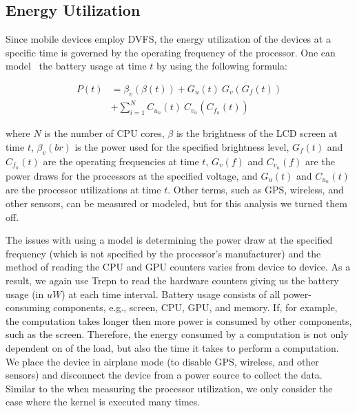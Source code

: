 \subsection{Energy Utilization}


Since mobile devices employ DVFS,
  the energy utilization of the devices at a specific time is governed by
  the operating frequency of the processor.
One can model~\cite{zhang2010accurate, dong2011self} the battery usage
at time $t$ by using the following formula:

\begin{align*}
P(t) &= \beta_v(\beta(t)) + G_u(t) ~ G_v(G_f(t)) \\
     &+ \sum_{i=1}^{N} C_{u_n}(t) ~ C_{v_n}(C_{f_n}(t))
\end{align*}

where $N$ is the number of CPU cores, $\beta$ is the brightness of the LCD screen at time $t$, $\beta_v(br)$ is the power used for the specified brightness level, $G_f(t)$ and $C_{f_n}(t)$ are the operating frequencies at time $t$, $G_v(f)$ and $ C_{v_n}(f)$ are the power draws for the processors at the specified voltage, and $G_u(t)$ and $C_{u_n}(t)$ are the processor utilizations at time $t$.
Other terms, such as GPS, wireless, and other sensors, can be measured or modeled, but for this analysis we turned them off.

The issues with using a model is determining the power draw at the specified
  frequency (which is not specified by the processor's manufacturer) and the method of reading
  the CPU and GPU counters varies from device to device.
As a result, we again use Trepn to read the hardware counters giving us the battery usage (in $uW$) at each time interval.
Battery usage consists of all power-consuming components, e.g., screen, CPU, GPU, and memory.
If, for example, the computation takes longer then more power is consumed by other components, such as the screen.
Therefore, the energy consumed by a computation is not only dependent on of the load, but also the time it takes to perform a computation.
We place the device in airplane mode (to disable GPS, wireless, and other sensors) and disconnect the device from a power source to 
  collect the data.
Similar to the when measuring the processor utilization, we only consider the case where the kernel is executed many times.


